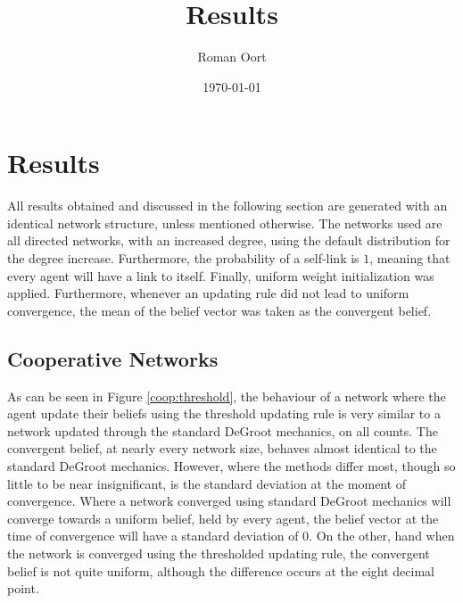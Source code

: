 \documentclass{article}
\title{Results}
\author{Roman Oort}
\date{\today}
\begin{document}
\maketitle

\tableofcontents
\newpage
\section{Results}

All results obtained and discussed in the following section are generated with an identical network structure, unless mentioned otherwise. The networks used are all directed networks, with an increased degree, using the default distribution for the degree increase. Furthermore, the probability of a self-link is $1$, meaning that every agent will have a link to itself. Finally, uniform weight initialization was applied. Furthermore, whenever an updating rule did not lead to uniform convergence, the mean of the belief vector was taken as the convergent belief.

\newpage

\subsection{Cooperative Networks}

As can be seen in Figure \ref{coop:threshold}, the behaviour of a network where the agent update their beliefs using the threshold updating rule is very similar to a network updated through the standard DeGroot mechanics, on all counts. The convergent belief, at nearly every network size, behaves almost identical to the standard DeGroot mechanics. However, where the methods differ most, though so little to be near insignificant, is the standard deviation at the moment of convergence. Where a network converged using standard DeGroot mechanics will converge towards a uniform belief, held by every agent, the belief vector at the time of convergence will have a standard deviation of $0$. On the other, hand when the network is converged using the thresholded updating rule, the convergent belief is not quite uniform, although the difference occurs at the eight decimal point. 
\end{document}
